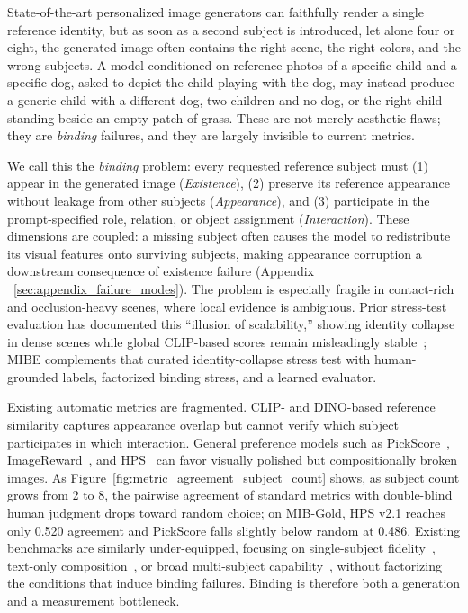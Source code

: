 \documentclass{article}
\begin{document}
State-of-the-art personalized image generators can faithfully render a single reference identity, but as soon as a second subject is introduced, let alone four or eight, the generated image often contains the right scene, the right colors, and the wrong subjects. A model conditioned on reference photos of a specific child and a specific dog, asked to depict the child playing with the dog, may instead produce a generic child with a different dog, two children and no dog, or the right child standing beside an empty patch of grass. These are not merely aesthetic flaws; they are \emph{binding} failures, and they are largely invisible to current metrics.

We call this the \emph{binding} problem: every requested reference subject must (1) appear in the generated image (\emph{Existence}), (2) preserve its reference appearance without leakage from other subjects (\emph{Appearance}), and (3) participate in the prompt-specified role, relation, or object assignment (\emph{Interaction}). These dimensions are coupled: a missing subject often causes the model to redistribute its visual features onto surviving subjects, making appearance corruption a downstream consequence of existence failure (Appendix ~\ref{sec:appendix_failure_modes}). The problem is especially fragile in contact-rich and occlusion-heavy scenes, where local evidence is ambiguous. Prior stress-test evaluation has documented this ``illusion of scalability,'' showing identity collapse in dense scenes while global CLIP-based scores remain misleadingly stable~\cite{chen2026identities}; MIBE complements that curated identity-collapse stress test with human-grounded labels, factorized binding stress, and a learned evaluator.

Existing automatic metrics are fragmented. CLIP- and DINO-based reference similarity captures appearance overlap but cannot verify which subject participates in which interaction. General preference models such as PickScore~\cite{kirstain2023pick}, ImageReward~\cite{xu2023imagereward}, and HPS~\cite{wu2023human} can favor visually polished but compositionally broken images. As Figure~\ref{fig:metric_agreement_subject_count} shows, as subject count grows from 2 to 8, the pairwise agreement of standard metrics with double-blind human judgment drops toward random choice; on MIB-Gold, HPS v2.1 reaches only 0.520 agreement and PickScore falls slightly below random at 0.486. Existing benchmarks are similarly under-equipped, focusing on single-subject fidelity~\cite{ruiz2023dreambooth,peng2024dreambench}, text-only composition~\cite{huang2023t2i}, or broad multi-subject capability~\cite{chen2025xverse,wang2025psr}, without factorizing the conditions that induce binding failures. 
Binding is therefore both a generation and a measurement bottleneck.
\end{document}
